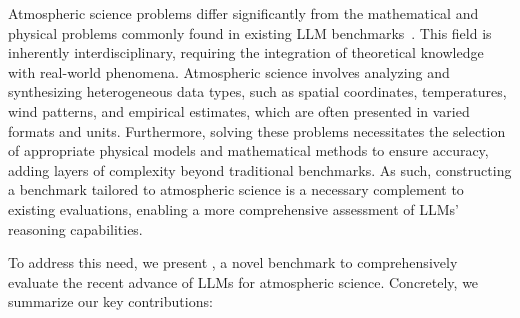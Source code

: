 


Atmospheric science problems differ significantly from the mathematical and physical problems commonly found in existing LLM benchmarks~\cite{hendrycks2021measuring,wang2023scibench}. This field is inherently interdisciplinary, requiring the integration of theoretical knowledge with real-world phenomena. Atmospheric science involves analyzing and synthesizing heterogeneous data types, such as spatial coordinates, temperatures, wind patterns, and empirical estimates, which are often presented in varied formats and units. Furthermore, solving these problems necessitates the selection of appropriate physical models and mathematical methods to ensure accuracy, adding layers of complexity beyond traditional benchmarks. As such, constructing a benchmark tailored to atmospheric science is a necessary complement to existing evaluations, enabling a more comprehensive assessment of LLMs' reasoning capabilities.


To address this need, we present \name, a novel benchmark to comprehensively evaluate the recent advance of LLMs for atmospheric science. Concretely, we summarize our key contributions:


